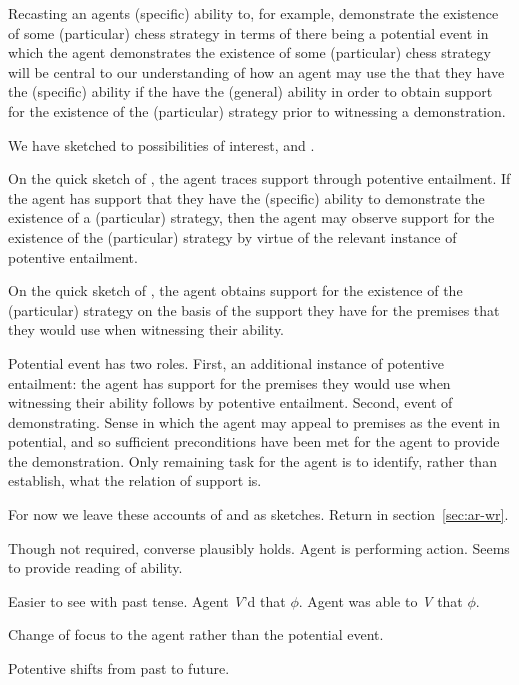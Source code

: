 \begin{note}
  Recasting an agents (specific) ability to, for example, demonstrate the existence of some (particular) chess strategy in terms of there being a potential event in which the agent demonstrates the existence of some (particular) chess strategy will be central to our understanding of how an agent may use the \gen{} that they have the (specific) ability if the have the (general) ability in order to obtain support for the existence of the (particular) strategy prior to witnessing a demonstration.

  We have sketched to possibilities of interest, \AR{} and \WR{}.

  On the quick sketch of \AR{}, the agent traces support through potentive entailment.
  If the agent has support that they have the (specific) ability to demonstrate the existence of a (particular) strategy, then the agent may observe support for the existence of the (particular) strategy by virtue of the relevant instance of potentive entailment.

  On the quick sketch of \WR{}, the agent obtains support for the existence of the (particular) strategy on the basis of the support they have for the premises that they would use when witnessing their ability.

  Potential event has two roles.
  First, an additional instance of potentive entailment: the agent has support for the premises they would use when witnessing their ability follows by potentive entailment.
  Second, event of demonstrating.
  Sense in which the agent may appeal to premises as the event in potential, and so sufficient preconditions have been met for the agent to provide the demonstration.
  Only remaining task for the agent is to identify, rather than establish, what the relation of support is.

  For now we leave these accounts of \AR{} and \WR{} as sketches.
  Return in section~\ref{sec:ar-wr}.
\end{note}



\begin{note}
  Though not required, converse plausibly holds.
  Agent is performing action.
  Seems to provide reading of ability.

  Easier to see with past tense.
  Agent \emph{V}'d that \(\phi\).
  Agent was able to \emph{V} that \(\phi\).

  Change of focus to the agent rather than the potential event.

  Potentive shifts from past to future.
\end{note}


